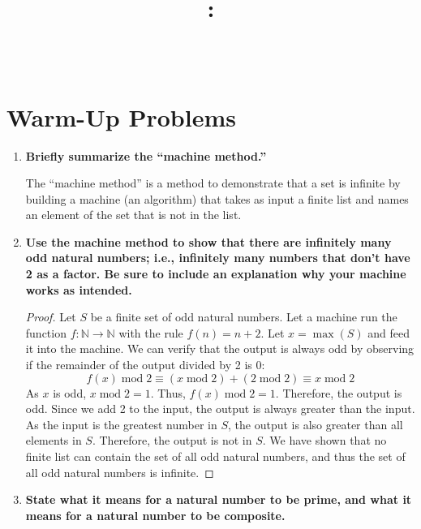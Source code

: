 \documentclass[article, 12pt]{article}
\title{
    \vspace{2in}
    \textmd{\textbf{\courseNumber: \courseName}}
    \normalsize\vspace{0.1in}\\
    \vspace{0.1in}\Large{\text{\psetName}} \\
    \vspace{0.1in}\large{\text{\professor}}
    \vspace{3in}
}
\author{\name}
\date{\dueDate}
\theoremstyle{definition}
\newcommand{\Mod}[1]{\;\mathrm{mod}\; #1} %
\newcommand{\nats}{\mathbb{N}}
\begin{document}
    \maketitle
    \thispagestyle{empty}
    \pagebreak

    \section{Warm-Up Problems}
    \begin{enumerate}[(1)]
        \item \textbf{Briefly summarize the “machine method.”}
        
        The ``machine method'' is a method to demonstrate that a set is infinite by building a machine (an algorithm) that takes as input a finite list and names an element of the set that is not in the list. 

        \item \textbf{Use the machine method to show that there are infinitely many odd natural numbers; i.e., infinitely many numbers that don’t have 2 as a factor. Be sure to include an explanation why your machine works as intended.}
        \begin{proof}
            Let $S$ be a finite set of odd natural numbers. Let a machine run the function $f: \nats \to \nats$ with the rule $f(n) = n + 2$. Let $x = \max(S)$ and feed it into the machine. We can verify that the output is always odd by observing if the remainder of the output divided by 2 is 0:
            \[ f(x) \Mod{2} \equiv (x \Mod{2}) + (2 \Mod{2}) \equiv x \Mod{2} \]
            As $x$ is odd, $x \Mod{2} = 1$. Thus, $f(x) \Mod{2} = 1$. Therefore, the output is odd. Since we add 2 to the input, the output is always greater than the input. As the input is the greatest number in $S$, the output is also greater than all elements in $S$. Therefore, the output is not in $S$. We have shown that no finite list can contain the set of all odd natural numbers, and thus the set of all odd natural numbers is infinite.
        \end{proof}
        \item \textbf{State what it means for a natural number to be prime, and what it means for a natural number to be composite.}
        

\end{enumerate}
\end{document}
